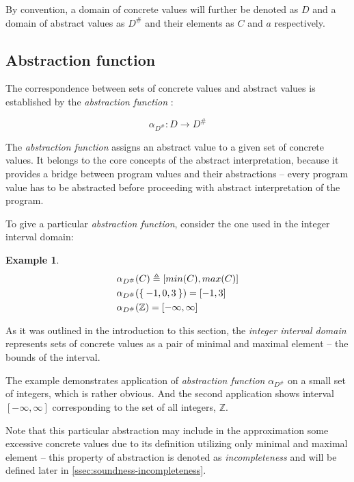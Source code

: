 \documentclass[12pt,oneside]{fithesis2}
\theoremstyle{definition}
\newtheorem{exmp}{Example}[section]
\begin{document}
By convention, a domain of concrete values will further be denoted as $D$ and a domain of abstract values as $D^\#$ and their elements as $C$ and $a$ respectively.

\subsection{Abstraction function}\label{ssec:abstraction-function}

The correspondence between sets of concrete values and abstract values is established by the \textit{abstraction function} \cite{CousotCousot76-1}:

\[
\alpha_{D^\#}\colon D \to D^\#
\]

The \textit{abstraction function} assigns an abstract value to a given set of concrete values. It belongs to the core concepts of the abstract interpretation, because it provides a bridge between program values and their abstractions -- every program value has to be abstracted before proceeding with abstract interpretation of the program.

To give a particular \textit{abstraction function}, consider the one used in the integer interval domain:

\begin{exmp}
  \begin{align*}
    &\alpha_{D^\#}(C) \triangleq [min(C), max(C)]\\
    &\alpha_{D^\#}(\Set{-1, 0, 3}) = [-1, 3]\\
    &\alpha_{D^\#}(\mathbb Z) = [-\infty, \infty]
  \end{align*}
\end{exmp}

As it was outlined in the introduction to this section, the \textit{integer interval domain} represents sets of concrete values as a pair of minimal and maximal element -- the bounds of the interval.

The example demonstrates application of \textit{abstraction function} $\alpha_{D^\#}$ on a small set of integers, which is rather obvious. And the second application shows interval $[-\infty, \infty]$ corresponding to the set of all integers, $\mathbb Z$.

Note that this particular abstraction may include in the approximation some excessive concrete values due to its definition utilizing only minimal and maximal element -- this property of abstraction is denoted as \textit{incompleteness} and will be defined later in \ref{ssec:soundness-incompleteness}.
\end{document}
